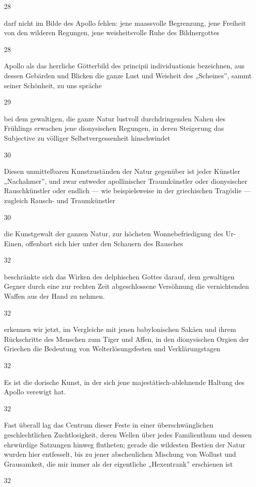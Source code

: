 \documentclass[
  letterpaper,
  DIV=11,
  numbers=noendperiod]{scrartcl}
\begin{document}
28

darf nicht im Bilde des Apollo fehlen: jene maassvolle Begrenzung, jene
Freiheit von den wilderen Regungen, jene weisheitsvolle Ruhe des
Bildnergottes

28

Apollo als das herrliche Götterbild des principii individuationis
bezeichnen, aus dessen Gebärden und Blicken die ganze Lust und Weisheit
des „Scheines'', sammt seiner Schönheit, zu uns spräche

29

bei dem gewaltigen, die ganze Natur lustvoll durchdringenden Nahen des
Frühlings erwachen jene dionysischen Regungen, in deren Steigerung das
Subjective zu völliger Selbstvergessenheit hinschwindet

30

Diesen unmittelbaren Kunstzuständen der Natur gegenüber ist jeder
Künstler „Nachahmer'', und zwar entweder apollinischer Traumkünstler
oder dionysischer Rauschkünstler oder endlich --- wie beispielsweise in
der griechischen Tragödie --- zugleich Rausch- und Traumkünstler

30

die Kunstgewalt der ganzen Natur, zur höchsten Wonnebefriedigung des
Ur-Einen, offenbart sich hier unter den Schauern des Rausches

32

beschränkte sich das Wirken des delphischen Gottes darauf, dem
gewaltigen Gegner durch eine zur rechten Zeit abgeschlossene Versöhnung
die vernichtenden Waffen aus der Hand zu nehmen.

32

erkennen wir jetzt, im Vergleiche mit jenen babylonischen Sakäen und
ihrem Rückschritte des Menschen zum Tiger und Affen, in den dionysischen
Orgien der Griechen die Bedeutung von Welterlösungsfesten und
Verklärungstagen

32

Es ist die dorische Kunst, in der sich jene majestätisch-ablehnende
Haltung des Apollo verewigt hat.

32

Fast überall lag das Centrum dieser Feste in einer überschwänglichen
geschlechtlichen Zuchtlosigkeit, deren Wellen über jedes Familienthum
und dessen ehrwürdige Satzungen hinweg flutheten; gerade die wildesten
Bestien der Natur wurden hier entfesselt, bis zu jener abscheulichen
Mischung von Wollust und Grausamkeit, die mir immer als der eigentliche
„Hexentrank'' erschienen ist

32
\end{document}
